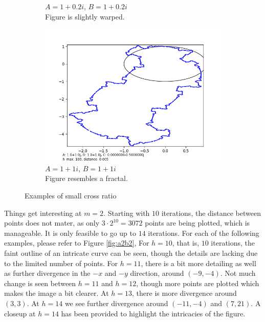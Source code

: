 \documentclass[12pt,a4paper,reqno,parskip=full]{amsart}
\numberwithin{equation}{section}
\theoremstyle{plain}
\theoremstyle{definition}
\begin{document}
\begin{figure}[H]
\begin{subfigure}[b]{0.3\textwidth}
         \caption{$A=1+0.2i$, $B=1+0.2i$\\Figure is slightly warped.}
         \label{fig:warped}
     \end{subfigure}
     \hfill
     \begin{subfigure}[b]{0.3\textwidth}
         \centering
         \includegraphics[width=\textwidth]{images/m/a1,b1,h100,d.005.png}
         \caption{$A=1+1i$, $B=1+1i$\\Figure resembles a fractal.}
         \label{fig:fractal}
     \end{subfigure}
        \caption{Examples of small cross ratio}
        \label{fig:small CR}
\end{figure}

Things get interesting at $m=2$. Starting with $10$ iterations, the distance between points does not mater, as only $3\cdot2^{10}=3072$ points are being plotted, which is manageable. It is only feasible to go up to $14$ iterations. For each of the following examples, please refer to Figure \ref{fig:a2b2}, For $h=10$, that is, $10$ iterations, the faint outline of an intricate curve can be seen, though the details are lacking due to the limited number of points. For $h=11$, there is a bit more detailing as well as further divergence in the $-x$ and $-y$ direction, around $(-9,-4)$. Not much change is seen between $h=11$ and $h=12$, though more points are plotted which makes the image a bit clearer. At $h=13$, there is more divergence around $(3,3)$. At $h=14$ we see further divergence around $(-11,-4)$ and $(7,21)$. A closeup at $h=14$ has been provided to highlight the intricacies of the figure. 
\end{document}
